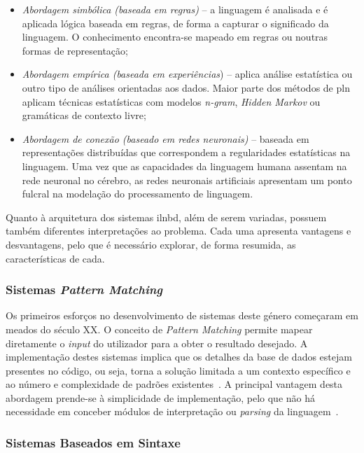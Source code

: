 \begin{itemize}
    \item 
    {
        \textit{Abordagem simbólica (baseada em regras)} -- a linguagem é analisada e é aplicada lógica baseada em regras, de forma a capturar o significado da linguagem. O conhecimento encontra-se mapeado em regras ou noutras formas de representação;
    }
    \item
    {
        \textit{Abordagem empírica (baseada em experiências}) -- aplica análise estatística ou outro tipo de análises orientadas aos dados. Maior parte dos métodos de \gls{pln} aplicam técnicas estatísticas com modelos \textit{n-gram}, \textit{Hidden Markov} ou gramáticas de contexto livre;
    }
    \item
    {
        \textit{Abordagem de conexão (baseado em redes neuronais)} -- baseada em representações distribuídas que correspondem a regularidades estatísticas na linguagem. Uma vez que as capacidades da linguagem humana assentam na rede neuronal no cérebro, as redes neuronais artificiais apresentam um ponto fulcral na modelação do processamento de linguagem.
    }
\end{itemize}

Quanto à arquitetura dos sistemas \gls{ilnbd}, além de serem variadas, possuem também diferentes interpretações ao problema. Cada uma apresenta vantagens e desvantagens, pelo que é necessário explorar, de forma resumida, as características de cada.

\subsubsection{Sistemas \textit{Pattern Matching}}

Os primeiros esforços no desenvolvimento de sistemas deste género começaram em meados do século XX. O conceito de \textit{Pattern Matching} permite mapear diretamente o \textit{input} do utilizador para a obter o resultado desejado. A implementação destes sistemas implica que os detalhes da base de dados estejam presentes no código, ou seja, torna a solução limitada a um contexto específico e ao número e complexidade de padrões existentes~\parencite{nlidb_brief_review}. A principal vantagem desta abordagem prende-se à simplicidade de implementação, pelo que não há necessidade em conceber módulos de interpretação ou \textit{parsing} da linguagem~\parencite{nlidb_brief_review, survey_nlidb}.

\subsubsection{Sistemas Baseados em Sintaxe}

